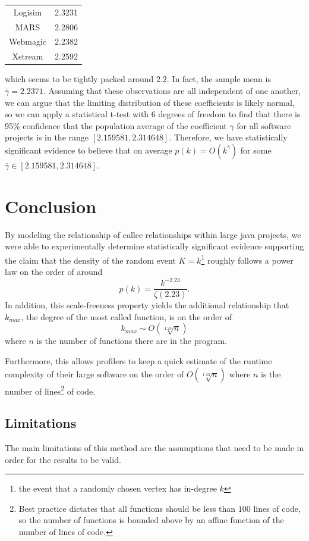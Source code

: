 \documentclass[11pt,a4paper,twocolumn]{article}
\begin{document}
\begin{singlespace}
\begin{table}[H]
\begin{tabular}{|c|c|}
Logisim & 2.3231 \\
MARS & 2.2806 \\
Webmagic & 2.2382 \\
Xstream & 2.2592 \\ \hline
\end{tabular}
\end{table}
\noindent which seems to be tightly packed around $2.2$. In fact, the sample mean is
$\bar \gamma = 2.2371$. Assuming that these observations are all independent
of one another, we can argue that the limiting distribution of these coefficients
is likely normal, so we can apply a statistical t-test with 6 degrees of freedom to find
that there is 95\% confidence that the population average of the coefficient $\gamma$
for all software projects is in the range $[2.159581, 2.314648]$. Therefore, we have
 statistically significant evidence to believe that on average
 $p(k) = O(k^{\bar \gamma})$ for some $\bar \gamma \in [2.159581, 2.314648]$.
\section{Conclusion}
By modeling the relationship of callee relationships within large java projects, we were
able to experimentally determine statistically significant evidence supporting
the claim that the density of the random event $K = k$\footnote{the event that a randomly
chosen vertex has in-degree $k$} roughly follows a power law on the order of around
$$p(k) = \frac{k^{-2.23}}{\zeta(2.23)}.$$ In addition, this scale-freeness property yields
the additional relationship that $k_{max}$, the degree of the most called function, is on the order of
$$k_{max} \sim O(\sqrt[1.23]{n})$$ where $n$ is the number of functions there are in the program.

Furthermore, this allows profilers to keep a quick estimate of the runtime complexity
of their large software on the order of $O(\sqrt[1.23]{n})$ where $n$ is the number of
lines\footnote{Best practice dictates that all functions should be less than $100$ lines
of code, so the number of functions is bounded above by an affine function of
the number of lines of code.} of code.
\subsection*{Limitations}

The main limitations of this method are the assumptions that need to be made in
order for the results to be valid.


\end{singlespace}
\end{document}
